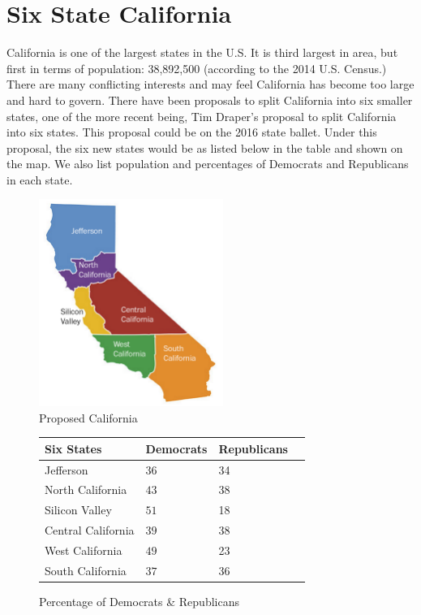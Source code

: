 \documentclass[12pt]{article}
\begin{document}
\section{Six State California}
California is one of the largest states in the U.S. It is third largest in area, but first in terms of population: 38,892,500 (according to the 2014 U.S. Census.) There are many conflicting interests and may feel California has become too large and hard to govern. There have been proposals to split California into six smaller states, one of the more recent being, Tim Draper's proposal to split California into six states. This proposal could be on the 2016 state ballet. Under this proposal, the six new states would be as listed below in the table and shown on the map. We also list population and percentages of Democrats and Republicans in each state. 
\newpage
\begin{figure}
\centering
\includegraphics[width=60mm]{six_californias.png}
\caption{Proposed California \label{overflow}}
\end{figure}

\begin{figure}
\begin{center}
\begin{tabular}{ | l | l | l | p{5cm} |}
    \hline
    Six States& Democrats & Republicans \\ \hline
    Jefferson&$36$ & 34 \\ \hline
    North California&$43$ & 38  \\ \hline
    Silicon Valley&$51$ & 18  \\ \hline
    Central California&$39$ & 38 \\ \hline
    West California&$49$ & 23  \\ \hline
    South California&$37$ & 36 \\ \hline
    \end{tabular}
    \caption{Percentage of Democrats \& Republicans \label{overflow}}
\end{center}
\end{figure}
\end{document}
